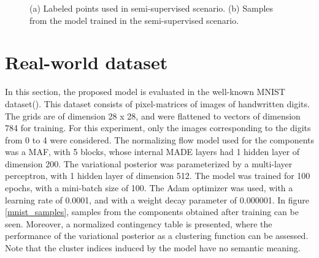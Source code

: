 \begin{figure}[!htb]
  \begin{subfigmatrix}{2}
  \end{subfigmatrix}
    \caption{(a) Labeled points used in semi-supervised scenario. (b) Samples
    from the model trained in the semi-supervised scenario.}
\label{fig:twocircles-semisup}
\end{figure}

\section{Real-world dataset}
In this section, the proposed model is evaluated in the well-known MNIST
dataset(\autocite{MNIST}). This dataset consists of pixel-matrices of images of
handwritten digits. The grids are of dimension 28 x 28, and were flattened
to vectors of dimension 784 for training. For this experiment, only the images
corresponding to the digits from 0 to 4 were considered. The normalizing
flow model used for the components was a MAF, with 5 blocks, whose internal MADE
layers had 1 hidden layer of dimension 200. The variational posterior was parameterized
by a multi-layer perceptron, with 1 hidden layer of dimension 512. The model
was trained for 100 epochs, with a mini-batch size of 100. The Adam optimizer
was used, with a learning rate of 0.0001, and with a weight decay parameter of
0.000001. In figure \ref{mnist_samples}, samples from the components obtained
after training can be seen. Moreover, a normalized contingency table is presented,
where the performance of the variational posterior as a clustering function
can be assessed. Note that the cluster indices induced by the model have no
semantic meaning.

